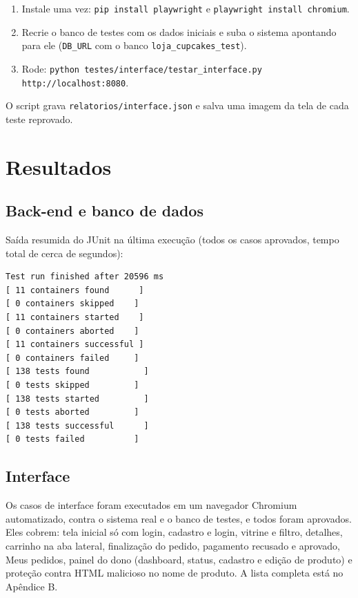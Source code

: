 \documentclass[12pt]{article}
\begin{document}
\begin{enumerate}
\item Instale uma vez: \texttt{pip install playwright} e \texttt{playwright install chromium}.
\item Recrie o banco de testes com os dados iniciais e suba o sistema apontando para ele (\texttt{DB\_URL} com o banco \texttt{loja\_cupcakes\_test}).
\item Rode: \texttt{python testes/interface/testar\_interface.py http://localhost:8080}.
\end{enumerate}

O script grava \texttt{relatorios/interface.json} e salva uma imagem da tela de cada teste reprovado.

\section{Resultados}

\subsection{Back-end e banco de dados}



Saída resumida do JUnit na última execução (todos os casos aprovados, tempo total de cerca de  segundos):

\begin{Verbatim}[fontsize=\footnotesize, frame=single]
Test run finished after 20596 ms
[ 11 containers found      ]
[ 0 containers skipped    ]
[ 11 containers started    ]
[ 0 containers aborted    ]
[ 11 containers successful ]
[ 0 containers failed     ]
[ 138 tests found           ]
[ 0 tests skipped         ]
[ 138 tests started         ]
[ 0 tests aborted         ]
[ 138 tests successful      ]
[ 0 tests failed          ]
\end{Verbatim}

\subsection{Interface}

Os  casos de interface foram executados em um navegador Chromium automatizado, contra o sistema real e o banco de testes, e todos foram aprovados. Eles cobrem: tela inicial só com login, cadastro e login, vitrine e filtro, detalhes, carrinho na aba lateral, finalização do pedido, pagamento recusado e aprovado, Meus pedidos, painel do dono (dashboard, status, cadastro e edição de produto) e proteção contra HTML malicioso no nome de produto. A lista completa está no Apêndice B.
\end{document}
